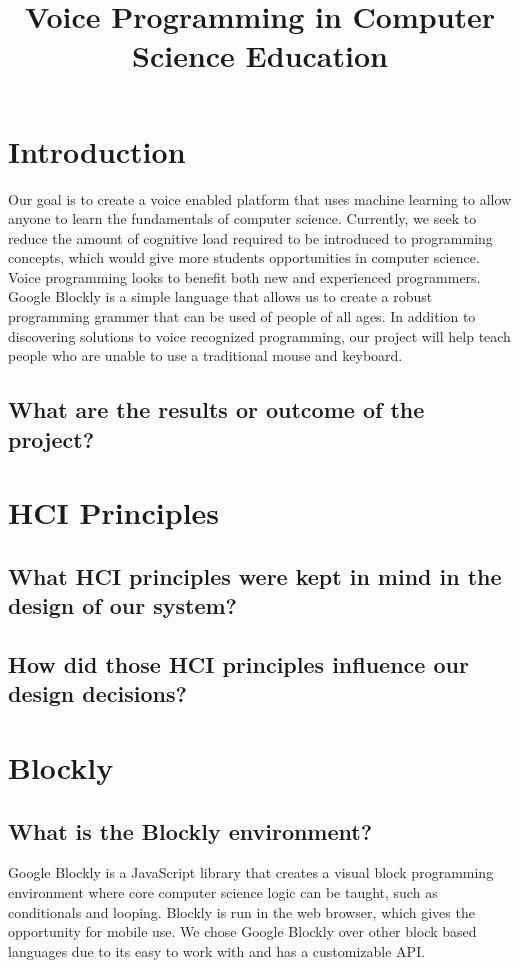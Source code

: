 \documentclass[]{article}
\title{Voice Programming in Computer Science Education}
\begin{document}
\maketitle

\section{Introduction}

Our goal is to create a voice enabled platform that uses machine learning to allow 
anyone to learn the fundamentals of computer science. Currently, we seek to reduce the amount
of cognitive load required to be introduced to programming concepts, which would give more 
students opportunities in computer science. 
\\ 
Voice programming looks to benefit both new and experienced programmers.  
Google Blockly is a simple language that allows us to create a robust programming grammer 
that can be used of people of all ages. In addition to discovering solutions to voice 
recognized programming, our project will help teach people who are unable to use a traditional mouse and keyboard.

\subsection{What are the results or outcome of the project?}

\section{HCI Principles}

\subsection{What HCI principles were kept in mind in the design of our system?}

\subsection{How did those HCI principles influence our design decisions?}

\section{Blockly}

\subsection{What is the Blockly environment?}
Google Blockly is a JavaScript library that creates a visual block programming 
environment where core computer science logic can be taught, such as conditionals and 
looping. Blockly is run in the web browser, which gives the opportunity for mobile use. 
We chose Google Blockly over other block based languages due to its easy to work with and 
has a customizable API.
\end{document}
